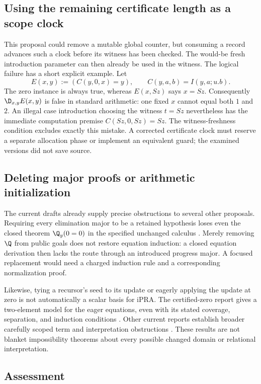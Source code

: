 \subsection{Using the remaining certificate length as a scope clock}

This proposal could remove a mutable global counter, but consuming a
record advances such a clock before its witness has been checked.
The would-be fresh introduction parameter can then already be used in
the witness. The logical failure has a short explicit example. Let
\[
 E(x,y):=(C(y,0,x)=y),\qquad C(y,a,b)=I(y,a;u.b).
\]
The zero instance is always true, whereas $E(x,Sz)$ says $x=Sz$.
Consequently $\D_{x,y}E(x,y)$ is false in standard arithmetic: one fixed
$x$ cannot equal both $1$ and $2$. An illegal case introduction choosing
the witness $t=Sz$ nevertheless has the immediate computation premise
$C(Sz,0,Sz)=Sz$. The witness-freshness condition excludes exactly this
mistake. A corrected certificate clock must reserve a separate allocation
phase or implement an equivalent guard; the examined versions did not
save source.

\subsection{Deleting major proofs or arithmetic initialization}

The current drafts already supply precise obstructions to several other
proposals. Requiring every elimination major to be a retained hypothesis
loses even the closed theorem $\Q_y(0=0)$ in the specified unchanged
calculus \cite{adaptive}. Merely removing $\Q$ from public goals does not
restore equation induction: a closed equation derivation then lacks the
route through an introduced progress major. A focused replacement would
need a charged induction rule and a corresponding normalization proof.

Likewise, tying a recursor's seed to its update or eagerly applying the
update at zero is not automatically a scalar basis for iPRA. The
certified-zero report gives a two-element model for the eager equations,
even with its stated coverage, separation, and induction conditions
\cite{certified}. Other current reports establish broader carefully
scoped term and interpretation obstructions \cite{adaptive,scopes}.
These results are not blanket impossibility theorems about every possible
changed domain or relational interpretation.

\subsection{Assessment}

